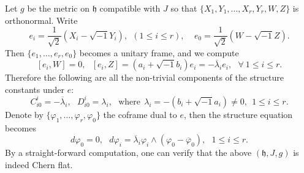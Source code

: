 \documentclass{amsart}
\begin{document}
Let $g$ be the metric on ${\mathfrak h}$ compatible with $J$ so that  $\{ X_1, Y_1, \ldots , X_r, Y_r, W, Z\}$ is orthonormal. Write
$$ e_i=\frac{1}{\sqrt{2}} (X_i - \sqrt{-1}Y_i), \ \ (1\leq i\leq r), \ \ \ \ \  e_0= \frac{1}{\sqrt{2}} (W-\sqrt{-1}Z). $$
Then $\{ e_1, \ldots , e_r, e_0\}$ becomes a unitary frame, and we compute 
$$ [e_i, W]=0, \ \ \ [e_i,Z] = (a_i+\sqrt{-1}b_i)e_i = - \overline{\lambda}_i e_i, \ \ \ \forall \ 1\leq i\leq r. $$
Therefore the following are all the non-trivial components of the structure constants under $e$:
$$ C^i_{i0}= -\overline{\lambda}_i, \ \ \ D^i_{i0}=\lambda_i, \ \ \ \mbox{where} \ \ \lambda_i = -(b_i+\sqrt{-1}a_i) \neq 0, \ \ 1\leq i\leq r. $$
Denote by $\{ \varphi_1, \ldots , \varphi_r, \varphi_0\}$ the coframe dual to $e$, then the structure equation becomes
$$ d\varphi_0=0, \ \ \ d\varphi_i = \overline{\lambda}_i \varphi_i \wedge (\varphi_0 - \overline{\varphi}_0), \ \ \ 1\leq i\leq r. $$
By a straight-forward computation, one can verify that the above $({\mathfrak h}, J,g)$ is indeed Chern flat. 

\vspace{0.2cm}
\end{document}
